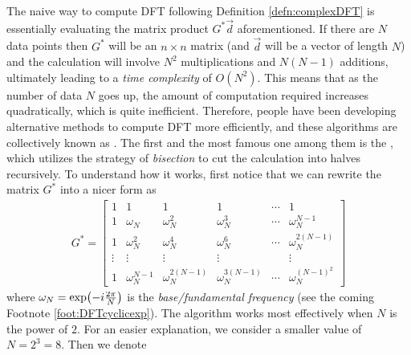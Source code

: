 The naive way to compute DFT following Definition \ref{defn:complexDFT} is essentially evaluating the matrix product $G^* \vec{d}$ aforementioned. If there are $N$ data points then $G^*$ will be an $n \times n$ matrix (and $\vec{d}$ will be a vector of length $N$) and the calculation will involve $N^2$ multiplications and $N(N-1)$ additions, ultimately leading to a \textit{time complexity} of $O(N^2)$. This means that as the number of data $N$ goes up, the amount of computation required increases quadratically, which is quite inefficient. Therefore, people have been developing alternative methods to compute DFT more efficiently, and these algorithms are collectively known as . The first and the most famous one among them is the , which utilizes the strategy of \textit{bisection} to cut the calculation into halves recursively. To understand how it works, first notice that we can rewrite the matrix $G^*$ into a nicer form as
\begin{align}
G^* = 
\begin{bmatrix}
1 & 1 & 1 & 1 & \cdots & 1 \\
1 & \omega_N & \omega_N^2 & \omega_N^3 & \cdots & \omega_N^{N-1} \\
1 & \omega_N^2 & \omega_N^4 & \omega_N^6 & \cdots & \omega_N^{2(N-1)} \\
\vdots & \vdots & \vdots & \vdots & & \vdots \\
1 & \omega_N^{N-1} & \omega_N^{2(N-1)} & \omega_N^{3(N-1)} & \cdots & \omega_N^{(N-1)^2}
\end{bmatrix}
\end{align}
where $\omega_N = \smash{\exp(-i\frac{2\pi}{N})}$ is the \textit{base/fundamental frequency} (see the coming Footnote \ref{foot:DFTcyclicexp}). The algorithm works most effectively when $N$ is the power of $2$. For an easier explanation, we consider a smaller value of $N = 2^3 = 8$. Then we denote
